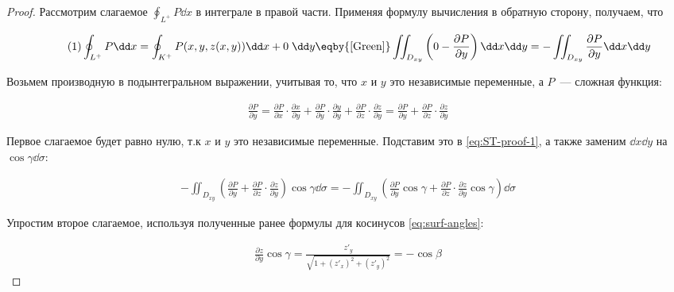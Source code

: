 \begin{proof}
  Рассмотрим слагаемое \(\displaystyle \oint_{L^{+}} P \dd x\) в интеграле в
  правой части. Применяя формулу вычисления в обратную сторону, получаем, что

  \begin{align*}\label{eq:ST-proof-1}\tag{1}
    \oint_{L^{+}} P \dd x
    = \oint_{K^{+}} P(x, y, z(x, y)) \dd x + 0 \; \dd y
    \eqby{\ref{Green}}
    \iint_{D_{xy}} \left(0 - \frac{\partial P}{\partial y} \right) \dd x \dd y
    = -\iint_{D_{xy}} \frac{\partial P}{\partial y} \dd x \dd y
  \end{align*}

  Возьмем производную в подынтегральном выражении, учитывая то, что \(x\) и
  \(y\) это независимые переменные, а \(P\)~--- сложная функция:

  \begin{align*}
    \frac{\partial P}{\partial y}
    = \frac{\partial P}{\partial x} \cdot \frac{\partial x}{\partial y}
      + \frac{\partial P}{\partial y} \cdot \frac{\partial y}{\partial y}
      + \frac{\partial P}{\partial z} \cdot \frac{\partial z}{\partial y}
    = \frac{\partial P}{\partial y}
      + \frac{\partial P}{\partial z} \cdot \frac{\partial z}{\partial y}
  \end{align*}

  Первое слагаемое будет равно нулю, т.к \(x\) и \(y\) это независимые
  переменные. Подставим это в \eqref{eq:ST-proof-1}, а также заменим
  \(\dd x \dd y\) на \(\cos \gamma \dd \sigma\):

  \begin{align*}\label{eq:ST-proof-2}\tag{2}
    -\iint_{D_{xy}} \left(
      \frac{\partial P}{\partial y}
      + \frac{\partial P}{\partial z} \cdot \frac{\partial z}{\partial y}
    \right) \cos \gamma \dd \sigma
    =
    -\iint_{D_{xy}} \left(
      \frac{\partial P}{\partial y} \cos \gamma
      + \frac{\partial P}{\partial z}
        \cdot \frac{\partial z}{\partial y} \cos \gamma
    \right) \dd \sigma
  \end{align*}

  Упростим второе слагаемое, используя полученные ранее формулы для косинусов
  \eqref{eq:surf-angles}:

  \begin{align*}\label{eq:ST-proof-3}\tag{3}
    \frac{\partial z}{\partial y} \cos \gamma
    = \frac{z'_{y}}{\sqrt{1 + (z'_{x})^2 + (z'_{y})^2}}
    = -\cos \beta
  \end{align*}


\end{proof}
